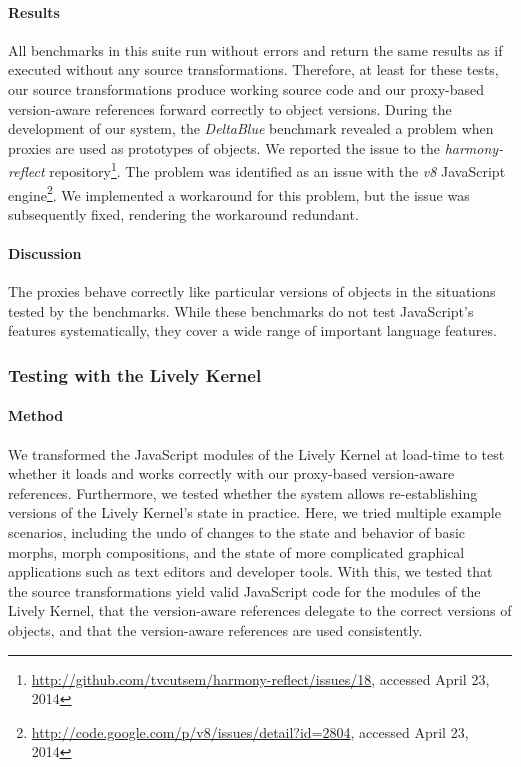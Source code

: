 \documentclass{sigplanconf}
\begin{document}
\paragraph{Results}
All benchmarks in this suite run without errors and return the same
results as if executed without any source transformations.  Therefore,
at least for these tests, our source transformations produce working
source code and our proxy-based version-aware references forward
correctly to object versions. During the development of our system,
the \emph{DeltaBlue} benchmark revealed a problem when proxies are
used as prototypes of objects.  We reported the issue to the
\emph{harmony-reflect}
repository\footnote{\url{http://github.com/tvcutsem/harmony-reflect/issues/18},
  accessed April 23, 2014}.  The problem was identified as an issue
with the \emph{v8} JavaScript
engine\footnote{\url{http://code.google.com/p/v8/issues/detail?id=2804},
  accessed April 23, 2014}.  We implemented a workaround for this
problem, but the issue was subsequently fixed, rendering the
workaround redundant.

\paragraph{Discussion}
The proxies behave correctly like particular versions of objects in
the situations tested by the benchmarks.  While these benchmarks do
not test JavaScript's features systematically, they cover a wide range
of important language features.

\subsubsection{Testing with the Lively Kernel}

\paragraph{Method}
We transformed the JavaScript modules of the Lively Kernel at
load-time to test whether it loads and works correctly with our
proxy-based version-aware references.  Furthermore, we tested whether
the system allows re-establishing versions of the Lively Kernel's
state in practice.  Here, we tried multiple example scenarios,
including the undo of changes to the state and behavior of basic
morphs, morph compositions, and the state of more complicated
graphical applications such as text editors and developer tools.  With
this, we tested that the source transformations yield valid JavaScript
code for the modules of the Lively Kernel, that the version-aware
references delegate to the correct versions of objects, and that the
version-aware references are used consistently.
\end{document}
